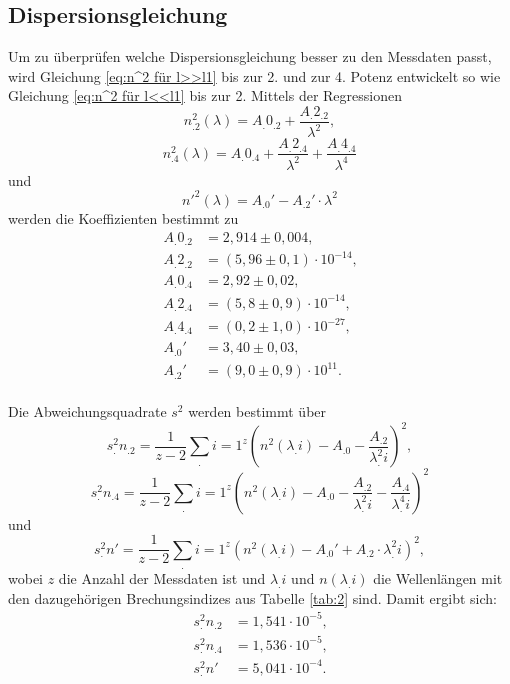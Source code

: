 \subsection{Dispersionsgleichung}
\label{sec:Dispersion}
Um zu überprüfen welche Dispersionsgleichung besser zu den Messdaten passt, wird Gleichung \eqref{eq:n^2 für l>>l1} bis zur 2. und zur 4. Potenz entwickelt so wie Gleichung \eqref{eq:n^2 für l<<l1} bis zur 2. 
Mittels der Regressionen
\begin{equation}
n^2_.2 (\lambda)=A_.{0_.2}+\frac{A_.{2_.2}}{\lambda^2},\label{eq:reg2}
\end{equation}
\begin{equation}
n^2_.4 (\lambda)=A_.{0_.4}+\frac{A_.{2_.4}}{\lambda^2}+\frac{A_.{4_.4}}{\lambda^4}\label{eq:reg4}
\end{equation}
und
\begin{equation}
n'^2(\lambda)=A_.0'-A_.2'\cdot \lambda^2\label{eq:reg'}
\end{equation}
werden die Koeffizienten bestimmt zu
\begin{align*}

A_.{0_.2}&= 2,914\pm 0,004\text{,} \\
A_.{2_.2}&= (5,96\pm 0,1)\cdot 10^{-14}\text{,} \\
A_.{0_.4}&= 2,92\pm 0,02 \text{,}\\
A_.{2_.4}&= (5,8\pm 0,9)\cdot 10^{-14}\text{,} \\
A_.{4_.4}&= (0,2\pm 1,0)\cdot 10^{-27}\text{,} \\
A_.0'  &= 3,40\pm 0,03\text{,} \\
A_.2'  &= (9,0\pm 0,9)\cdot 10^{11}\text{.} \\
\end{align*}

\noindent Die Abweichungsquadrate $s^2$ werden bestimmt über 
\begin{equation}
s^2_.{n_.2} = \frac{1}{z-2}\sum_.{i=1}^z \left(n^2(\lambda_.i)-A_.0-\frac{A_.2}{\lambda^2_.i}\right)^2,
\end{equation}
\begin{equation}
s^2_.{n_.4} = \frac{1}{z-2}\sum_.{i=1}^z \left(n^2(\lambda_.i)-A_.0-\frac{A_.2}{\lambda^2_.i}-\frac{A_.4}{\lambda^4_.i}\right)^2
\end{equation}
und
\begin{equation}
s^2_.{n'} = \frac{1}{z-2}\sum_.{i=1}^z \left(n^2(\lambda_.i)-A_.0' +A_.2\cdot\lambda^2_.i\right)^2,
\end{equation}
wobei $z$ die Anzahl der Messdaten ist und $\lambda_.i$ und $n(\lambda_.i)$ die Wellenlängen mit den dazugehörigen Brechungsindizes aus Tabelle \ref{tab:2} sind.
Damit ergibt sich:
\begin{align*}
s^2_.{n_.2}&=1,541\cdot 10^{-5}\text{,} \\
s^2_.{n_.4}&=1,536\cdot 10^{-5}\text{,} \\
s^2_.{n'}&=5,041\cdot 10^{-4}\text{.} \\

\end{align*}

